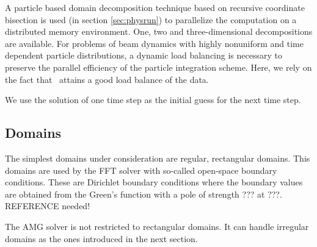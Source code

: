 A particle based domain decomposition technique based on recursive coordinate
bisection is used (in section \ref{sec:physrun}) to parallelize the computation
on a distributed memory environment.  One, two and three-dimensional
decompositions are available.  For problems of beam dynamics with highly
nonuniform and time dependent particle distributions, a dynamic load balancing
is necessary to preserve the parallel efficiency of the particle integration
scheme.  Here, we rely on the fact that \ippl\ attains a good load balance of
the data.



We use the solution of one time step as the initial guess for the next
time step.


\subsection{Domains}

The simplest domains under consideration are regular, rectangular
domains.  This domains are used by the FFT solver with so-called
open-space boundary conditions.  {\color{red}These are Dirichlet
  boundary conditions where the boundary values are obtained from the
  Green's function with a pole of strength ??? at ???.  REFERENCE
  needed!}

The AMG solver is not restricted to rectangular domains.  It can handle
irregular domains as the ones introduced in the next section.


